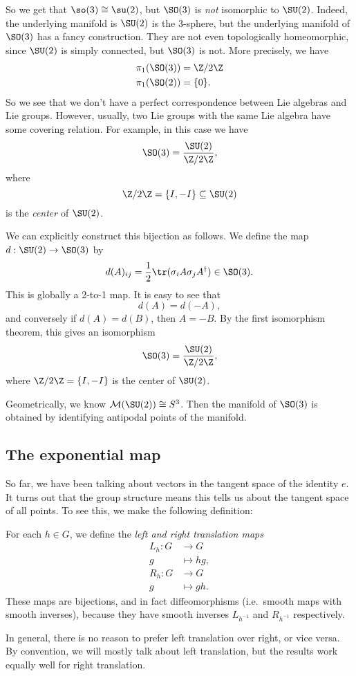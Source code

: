 \documentclass[a4paper]{article}
\begin{document}
So we get that $\so(3) \cong \su(2)$, but $\SO(3)$ is \emph{not} isomorphic to $\SU(2)$. Indeed, the underlying manifold is $\SU(2)$ is the $3$-sphere, but the underlying manifold of $\SO(3)$ has a fancy construction. They are not even topologically homeomorphic, since $\SU(2)$ is simply connected, but $\SO(3)$ is not. More precisely, we have
\begin{align*}
  \pi_1(\SO(3)) &= \Z/2\Z\\
  \pi_1(\SO(2)) &= \{0\}.
\end{align*}
So we see that we don't have a perfect correspondence between Lie algebras and Lie groups. However, usually, two Lie groups with the same Lie algebra have some covering relation. For example, in this case we have
\[
  \SO(3) = \frac{\SU(2)}{\Z/2\Z},
\]
where
\[
  \Z/2\Z = \{I, -I\} \subseteq \SU(2)
\]
is the \emph{center} of $\SU(2)$.

We can explicitly construct this bijection as follows. We define the map $d: \SU(2) \to \SO(3)$ by
\[
  d(A)_{ij} = \frac{1}{2} \tr (\sigma_i A\sigma_j A^\dagger) \in \SO(3).
\]
This is globally a 2-to-1 map. It is easy to see that
\[
  d(A) = d(-A),
\]
and conversely if $d(A) = d(B)$, then $A = -B$. By the first isomorphism theorem, this gives an isomorphism
\[
  \SO(3) = \frac{\SU(2)}{\Z/2\Z},
\]
where $\Z/2\Z = \{I, -I\}$ is the center of $\SU(2)$.

Geometrically, we know $\mathcal{M}(\SU(2)) \cong S^3$. Then the manifold of $\SO(3)$ is obtained by identifying antipodal points of the manifold.

\subsection{The exponential map}
So far, we have been talking about vectors in the tangent space of the identity $e$. It turns out that the group structure means this tells us about the tangent space of all points. To see this, we make the following definition:

\begin{defi}
  For each $h \in G$, we define the \emph{left and right translation maps}
  \begin{align*}
    L_h: G &\to G\\
    g &\mapsto hg,\\
    R_h: G &\to G\\
    g &\mapsto gh.
  \end{align*}
  These maps are bijections, and in fact diffeomorphisms (i.e.\ smooth maps with smooth inverses), because they have smooth inverses $L_{h^{-1}}$ and $R_{h^{-1}}$ respectively.
\end{defi}
In general, there is no reason to prefer left translation over right, or vice versa. By convention, we will mostly talk about left translation, but the results work equally well for right translation.
\end{document}
